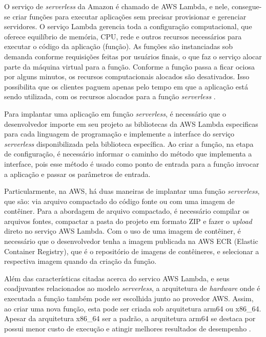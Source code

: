 \documentclass[conference]{IEEEtran}
\begin{document}
O serviço de \textit{serverless} da Amazon é chamado de AWS Lambda, e nele, consegue-se criar funções para executar aplicações sem precisar provisionar e gerenciar servidores. 
O serviço Lambda gerencia toda a configuração computacional, que oferece equilíbrio de memória, CPU, rede e outros recursos necessários para executar o código da aplicação (função).
As funções são instanciadas sob demanda conforme requisições feitas por usuários finais, o que faz o serviço alocar parte da máquina virtual para a função. Conforme a função passa a ficar ociosa por alguns minutos, os recursos computacionais alocados são desativados. Isso possibilita que os clientes paguem apenas pelo tempo em que a aplicação está sendo utilizada, com os recursos alocados para a função \textit{serverless} \cite{aws_2023_what_is_lambda}.

Para implantar uma aplicação em função \textit{serverless}, é necessário que o desenvolvedor importe em seu projeto as bibliotecas da AWS Lambda especificas para cada linguagem de programação e implemente a interface do serviço \textit{serverless} disponibilizada pela biblioteca específica. Ao criar a função, na etapa de configuração, é necessário informar o caminho do método que implementa a interface, pois esse método é usado como ponto de entrada para a função invocar a aplicação e passar os parâmetros de entrada.

Particularmente, na AWS, há duas maneiras de implantar uma função \textit{serverless}, que são: via arquivo compactado do código fonte ou com uma imagem de contêiner. Para a abordagem de arquivo compactado, é necessário compilar os arquivos fontes, compactar a pasta do projeto em formato ZIP e fazer o \textit{upload} direto no serviço AWS Lambda. Com o uso de uma imagem de contêiner, é necessário que o desenvolvedor tenha a imagem publicada na AWS ECR (Elastic Container Registry), que é o repositório de imagens de contêineres, e selecionar a respectiva imagem quando da criação da função.

Além das características citadas acerca do servico AWS Lambda, e seus coadjuvantes relacionados ao modelo \textit{serverless}, a arquitetura de \textit{hardware} onde é executada a função também pode ser escolhida junto ao provedor AWS. Assim, ao criar uma nova função, esta pode ser criada sob arquitetura arm64 ou x86\_64. Apesar da arquitetura x86\_64 ser a padrão, a arquitetura arm64 se destaca por possui menor custo de execução e atingir melhores resultados de desempenho
\cite{aws_2023_aws_lambda_architectures}.
\end{document}
